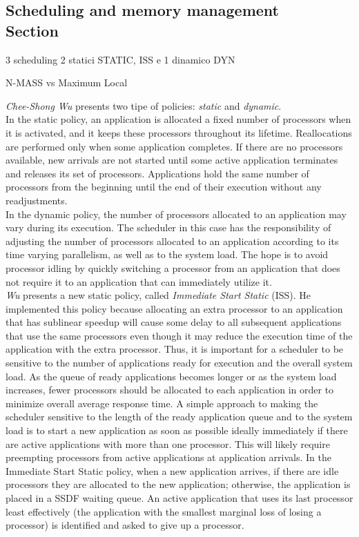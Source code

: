 \documentclass[a4paper,10pt]{article}
\begin{document}
\begin{multicols}{2}
\subsection{Scheduling and memory management \\ Section}

3 scheduling 2 statici STATIC, ISS e 1 dinamico DYN

N-MASS vs Maximum Local

\emph{Chee-Shong Wu} \cite{Wu93processorscheduling} presents two tipe of policies: \emph{static} and \emph{dynamic}. \\
In the static policy, an application is allocated a fixed number of processors when it is activated, and it keeps these processors throughout its lifetime. Reallocations are performed only when some application completes. If there are no processors available, new arrivals are not started until some active application terminates and releases its set of processors. Applications hold the same number of processors from the beginning until the end of their execution without any readjustments.\\
In the dynamic policy, the number of processors allocated to an application may vary during its execution. The scheduler in this case has the responsibility of adjusting the number of processors allocated to an application according to its time varying parallelism, as well as to the system load. The hope is to avoid processor idling by quickly switching a processor from an application that does not require it to an application that can immediately utilize it.\\
\emph{Wu} presents a new static policy, called \emph{Immediate Start Static} (ISS). He implemented this policy because allocating an extra processor to an application that has sublinear speedup will cause some delay to all subsequent applications that use the same processors even though it may reduce the execution time of the application with the extra processor. Thus, it is important for a scheduler to be sensitive to the number of applications ready for execution and the overall system load. As the queue of ready applications becomes longer or as the system load increases, fewer processors should be allocated to each application in order to minimize overall average response time. A simple approach to making the scheduler sensitive to the length of the ready application queue and to the system load is to start a new application as soon as possible ideally immediately if there are active applications with more than one processor. This will likely require preempting processors from active applications at application arrivals. In the Immediate Start Static policy, when a new application arrives, if there are idle processors they are allocated to the new application; otherwise, the application is placed in a SSDF waiting queue. An active application that uses its last processor least effectively (the application with the smallest marginal loss of losing a processor) is identified and asked to give up a processor.

\end{multicols}
\end{document}
